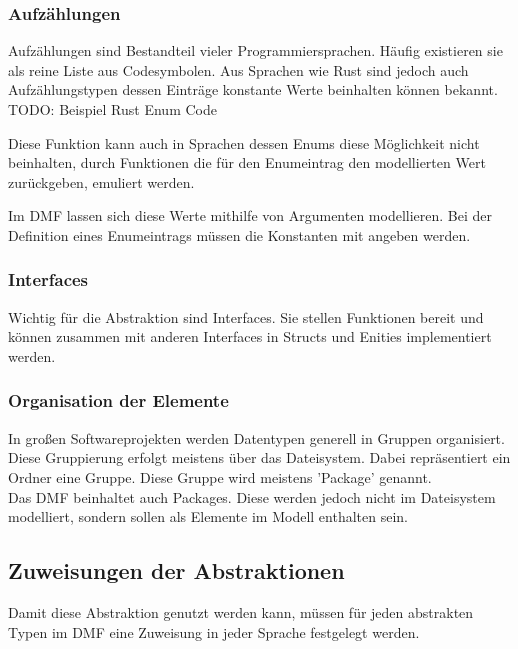 \documentclass[./einleitung.tex]{subfiles}
\begin{document}
\subsubsection{Aufzählungen}
Aufzählungen sind Bestandteil vieler Programmiersprachen. Häufig existieren sie als reine Liste  aus Codesymbolen. Aus Sprachen wie Rust sind jedoch auch Aufzählungstypen dessen Einträge konstante Werte beinhalten können bekannt.
TODO: Beispiel Rust Enum Code

Diese Funktion kann auch in Sprachen dessen Enums diese Möglichkeit nicht beinhalten, durch Funktionen die für den Enumeintrag den modellierten Wert zurückgeben, emuliert werden.

Im DMF lassen sich diese Werte mithilfe von Argumenten modellieren. Bei der Definition eines Enumeintrags müssen die Konstanten mit angeben werden.

\subsubsection{Interfaces}
Wichtig für die Abstraktion sind Interfaces. Sie stellen Funktionen bereit und können zusammen mit anderen Interfaces in Structs und Enities implementiert werden.

\subsubsection{Organisation der Elemente}
In großen Softwareprojekten werden Datentypen generell in Gruppen organisiert. Diese Gruppierung erfolgt meistens über das Dateisystem. Dabei repräsentiert ein Ordner eine Gruppe. Diese Gruppe wird meistens 'Package' genannt. \\
Das DMF beinhaltet auch Packages. Diese werden jedoch nicht im Dateisystem modelliert, sondern sollen als Elemente im Modell enthalten sein.

\subsection{Zuweisungen der Abstraktionen}

Damit diese Abstraktion genutzt werden kann, müssen für jeden abstrakten Typen im DMF eine Zuweisung in jeder Sprache festgelegt werden.
\end{document}
